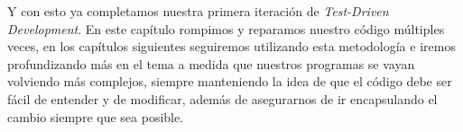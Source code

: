   Y con esto ya completamos nuestra primera iteración de \textit{Test-Driven Development}. En este
  capítulo rompimos y reparamos nuestro código múltiples veces, en los capítulos siguientes 
  seguiremos utilizando esta metodología e iremos profundizando más en el tema a medida que nuestros 
  programas se vayan volviendo más complejos, siempre manteniendo la idea de que el código debe ser
  fácil de entender y de modificar, además de asegurarnos de ir encapsulando el cambio siempre que
  sea posible.